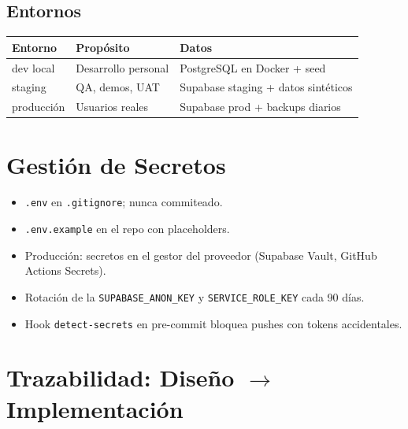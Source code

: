 \documentclass[12pt,a4paper,oneside]{article}
\begin{document}
\subsection{Entornos}

\begin{table}[h]
\centering
\begin{tabular}{lll}
\toprule
\textbf{Entorno} & \textbf{Propósito} & \textbf{Datos} \\
\midrule
dev local & Desarrollo personal & PostgreSQL en Docker + seed \\
staging & QA, demos, UAT & Supabase staging + datos sintéticos \\
producción & Usuarios reales & Supabase prod + backups diarios \\
\bottomrule
\end{tabular}
\end{table}

\section{Gestión de Secretos}

\begin{itemize}[leftmargin=*]
  \item \texttt{.env} en \texttt{.gitignore}; nunca commiteado.
  \item \texttt{.env.example} en el repo con placeholders.
  \item Producción: secretos en el gestor del proveedor (Supabase Vault, GitHub Actions Secrets).
  \item Rotación de la \texttt{SUPABASE\_ANON\_KEY} y \texttt{SERVICE\_ROLE\_KEY} cada 90 días.
  \item Hook \texttt{detect-secrets} en pre-commit bloquea pushes con tokens accidentales.
\end{itemize}

\section{Trazabilidad: Diseño $\rightarrow$ Implementación}
\end{document}
